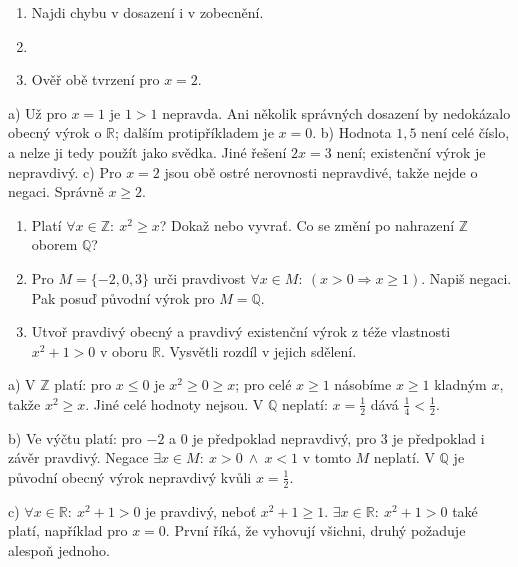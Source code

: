 \documentclass[11pt,a4paper]{article}
\begin{document}
\begin{zadaniReseniBox}[title={Samostatná práce 2},breakable=false]
\begin{enumerate}[label=\alph*)]
\item {} Najdi chybu v dosazení i v zobecnění.
\item {}
\item {} Ověř obě tvrzení pro $x=2$.
\end{enumerate}
\tcblower
a) Už pro $x=1$ je $1>1$ nepravda. Ani několik správných dosazení by
nedokázalo obecný výrok o $\mathbb R$; dalším protipříkladem je $x=0$.
b) Hodnota $1{,}5$ není celé číslo, a nelze ji tedy použít jako svědka.
Jiné řešení $2x=3$ není; existenční výrok je nepravdivý.
c) Pro $x=2$ jsou obě ostré nerovnosti nepravdivé, takže nejde o negaci.
Správně $x\ge2$.
\end{zadaniReseniBox}


\begin{zadaniReseniBox}[title={Rozšíření 1},breakable=false]
\begin{enumerate}[label=\alph*)]
\item Platí $\forall x\in\mathbb Z:\ x^2\ge x$? Dokaž nebo vyvrať.
Co se změní po nahrazení $\mathbb Z$ oborem $\mathbb Q$?
\item Pro $M=\{-2,0,3\}$ urči pravdivost
$\forall x\in M:\ (x>0\Rightarrow x\ge1)$. Napiš negaci.
Pak posuď původní výrok pro $M=\mathbb Q$.
\item Utvoř pravdivý obecný a pravdivý existenční výrok z téže vlastnosti
$x^2+1>0$ v oboru $\mathbb R$. Vysvětli rozdíl v jejich sdělení.
\end{enumerate}
\tcblower
a) V $\mathbb Z$ platí: pro $x\le0$ je $x^2\ge0\ge x$;
pro celé $x\ge1$ násobíme $x\ge1$ kladným $x$, takže $x^2\ge x$.
Jiné celé hodnoty nejsou. V $\mathbb Q$ neplatí: $x=\frac12$ dává
$\frac14<\frac12$.

b) Ve výčtu platí: pro $-2$ a $0$ je předpoklad nepravdivý,
pro $3$ je předpoklad i závěr pravdivý.
Negace $\exists x\in M:\ x>0\ \land\ x<1$ v tomto $M$ neplatí.
V $\mathbb Q$ je původní obecný výrok nepravdivý kvůli $x=\frac12$.

c) $\forall x\in\mathbb R:\ x^2+1>0$ je pravdivý, neboť $x^2+1\ge1$.
$\exists x\in\mathbb R:\ x^2+1>0$ také platí, například pro $x=0$.
První říká, že vyhovují všichni, druhý požaduje alespoň jednoho.
\end{zadaniReseniBox}
\end{document}
